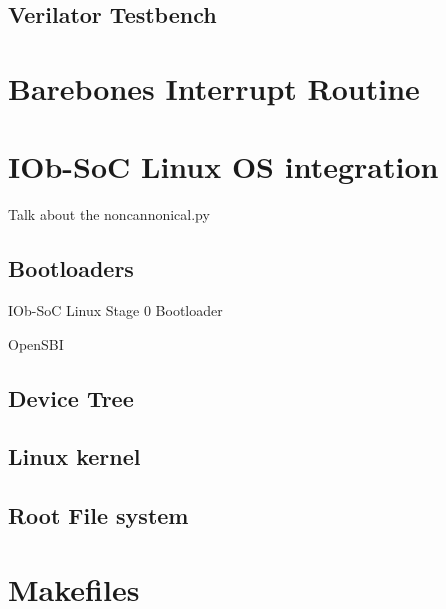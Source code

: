 \subsection{Verilator Testbench}


\section{Barebones Interrupt Routine}
\label{section:barebones_interrupt_routine}

\section{IOb-SoC Linux OS integration}
\label{section:linux_os_integration}
Talk about the noncannonical.py

\subsection{Bootloaders}
IOb-SoC Linux Stage 0 Bootloader

OpenSBI

\subsection{Device Tree}

\subsection{Linux kernel}

\subsection{Root File system}

\section{Makefiles}